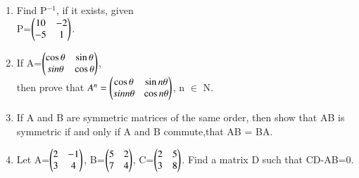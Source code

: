 \begin{enumerate}[label=\arabic*.,ref=\thesubsection.\theenumi]
\item Find P$^{-1}$, if it exists, given \\
P=$\begin{pmatrix}10 &-2\\-5 &1\end{pmatrix}$.\\
\item If A=$\begin{pmatrix}\cos\theta &\sin\theta\\ \-sin\theta &\cos\theta\end{pmatrix}$,\\then prove that $A^{n}=\begin{pmatrix}\cos\theta &\sin n\theta\\\-sin n\theta &\cos n\theta\end{pmatrix}$, n $\in$ N.\\
\item If A and B are symmetric matrices of the same order, then show that AB is symmetric if and only if A and B commute,that AB = BA.\\
\item Let A=$\begin{pmatrix}2 &-1\\3 &4\end{pmatrix}$, B=$\begin{pmatrix}5 &2\\7 &4\end{pmatrix}$, C=$\begin{pmatrix}2 &5\\3 &8\end{pmatrix}$. Find a matrix D such that CD-AB=0. 

\end{enumerate}
%
    
